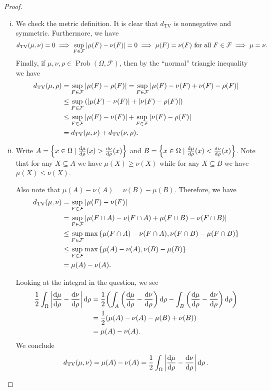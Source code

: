 \documentclass{article}
\theoremstyle{plain}
\theoremstyle{remark}
\newcommand{\Cal}{\mathcal}
\newcommand{\Rm}{\mathrm}
\newcommand\FF{\Cal F}
\DeclareMathOperator\Prob{Prob}
\begin{document}
\begin{proof}
	\begin{enumerate}[(i)]
		\item We check the metric definition. It is clear that $d_\Rm{TV}$ is nonnegative and symmetric. Furthermore, we have
		\[
		d_\Rm{TV}(\mu, \nu) = 0 \implies \sup_{F\in \FF} \abs{\mu(F) - \nu(F)} = 0 \implies \mu(F) = \nu(F) \text{ for all } F \in \FF \implies \mu = \nu.
		\]
		Finally, if $\mu, \nu, \rho \in \Prob(\Omega, \FF)$, then by the ``normal'' triangle inequality we have
		\begin{align*}
			d_\Rm{TV}(\mu, \rho) &= \sup_{F \in \FF} \abs{\mu(F) - \rho(F)} = \sup_{F \in \FF} \abs{\mu(F) - \nu(F) + \nu(F) - \rho(F)} \\
			&\leq \sup_{F \in \FF} \qty(\abs{\mu(F) - \nu(F)} + \abs{\nu(F) - \rho(F)}) \\
			&\leq \sup_{F \in \FF} \abs{\mu(F) - \nu(F)} + \sup_{F\in \FF} \abs{\nu(F) - \rho(F)} \\
			&= d_\Rm{TV}(\mu, \nu) + d_\Rm{TV}(\nu, \rho). 
		\end{align*}
	
	\item Write $A = \qty{x \in \Omega \mid \dv{\mu}{\rho}\qty(x) > \dv{\nu}{\rho}\qty(x)}$ and $B = \qty{x \in \Omega \mid \dv{\mu}{\rho}\qty(x) < \dv{\nu}{\rho}\qty(x)}$. 
	Note that for any $X \subseteq A$ we have $\mu(X) \geq \nu(X)$ while for any $X \subseteq B$ we have $\mu(X) \leq \nu(X)$.  
	
	Also note that $\mu(A) - \nu(A) = \nu(B) - \mu(B)$. 
	Therefore, we have
	\begin{align*}
	d_\Rm{TV}(\mu, \nu) &= \sup_{F \in \FF} \abs{\mu(F) - \nu(F)} \\
	&= \sup_{F \in \FF} \abs{\mu(F \cap A) - \nu(F \cap A) + \mu(F \cap B) - \nu(F \cap B)} \\
	&\leq \sup_{F \in \FF} \max\qty{\mu(F \cap A) - \nu(F \cap A), \nu(F \cap B) - \mu(F \cap B)} \\
	&\leq \sup_{F \in \FF} \max\qty{\mu(A) - \nu(A), \nu(B) - \mu(B)} \\
	&= \mu(A) - \nu(A). 
	\end{align*}

	Looking at the integral in the question, we see
	\begin{align*}
		\frac12\int_\Omega \abs{\dv{\mu}{\rho} - \dv{\nu}{\rho}} \dd{\rho} &=  \frac12 \qty(\int_A \qty(\dv{\mu}{\rho} - \dv{\nu}{\rho}) \dd{\rho} - \int_B \qty(\dv{\mu}{\rho} - \dv{\nu}{\rho}) \dd{\rho}) \\
		&= \frac12\qty(\mu(A) - \nu(A) - \mu(B) + \nu(B)) \\
		&= \mu(A) - \nu(A). 
	\end{align*}
We conclude
\[
d_\Rm{TV}(\mu, \nu) = \mu(A) - \nu(A) = \frac12\int_\Omega \abs{\dv{\mu}{\rho} - \dv{\nu}{\rho}} \dd{\rho}.
\]


\end{enumerate}
\end{proof}
\end{document}
